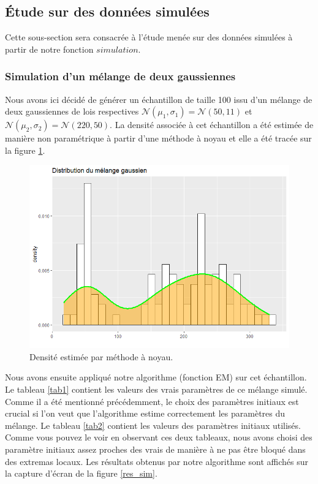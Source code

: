 \documentclass[a4paper,french,10pt]{article}
\begin{document}
\newpage

\subsection{Étude sur des données simulées}
Cette sous-section sera consacrée à l'étude menée sur des données simulées à partir de notre fonction $simulation$.

\subsubsection{Simulation d'un mélange de deux gaussiennes } 
Nous avons ici décidé de générer un échantillon de taille 100 issu d'un mélange de deux gaussiennes de lois respectives $\mathcal{N}(\mu_1, \sigma_1) = \mathcal{N}(50, 11)$ et $\mathcal{N}(\mu_2, \sigma_2) = \mathcal{N}(220, 50)$.
La densité associée à cet échantillon a été estimée de manière non paramétrique à partir d'une méthode à noyau et elle a été tracée sur la figure \ref{density_sim}.

\begin{figure}[htp] 
	\centering
	\includegraphics[scale=0.45]{images/dens_sim.png}
	\caption{Densité estimée par méthode à noyau.}
	\label{density_sim}
\end{figure}

Nous avons ensuite appliqué notre algorithme (fonction EM) sur cet échantillon. Le tableau \ref{tab1} contient les valeurs des vrais paramètres de ce mélange simulé. Comme il a été mentionné précédemment, le choix des paramètres initiaux est crucial si l'on veut que l'algorithme estime correctement les paramètres du mélange. Le tableau \ref{tab2} contient les valeurs des paramètres initiaux utilisés. Comme vous pouvez le voir en observant ces deux tableaux, nous avons choisi des paramètre initiaux assez proches des vrais de manière à ne pas être bloqué dans des extremas locaux. Les résultats obtenus par notre algorithme sont affichés sur la capture d'écran de la figure \ref{res_sim}.
\end{document}
